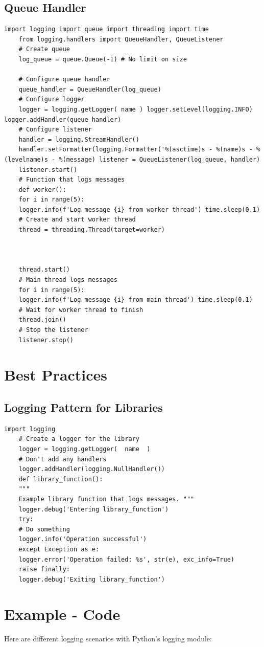 \subsection{Queue Handler}
\begin{lstlisting}[style=pythonstyle]
	import logging import queue import threading import time
	from logging.handlers import QueueHandler, QueueListener
	# Create queue
	log_queue = queue.Queue(-1)	# No limit on size
	
	# Configure queue handler
	queue_handler = QueueHandler(log_queue)
	# Configure logger
	logger = logging.getLogger( name ) logger.setLevel(logging.INFO) logger.addHandler(queue_handler)
	# Configure listener
	handler = logging.StreamHandler()
	handler.setFormatter(logging.Formatter('%(asctime)s - %(name)s - %(levelname)s - %(message) listener = QueueListener(log_queue, handler)
	listener.start()
	# Function that logs messages
	def worker():
	for i in range(5):
	logger.info(f'Log message {i} from worker thread') time.sleep(0.1)
	# Create and start worker thread
	thread = threading.Thread(target=worker)
	
	
	
	thread.start()
	# Main thread logs messages
	for i in range(5):
	logger.info(f'Log message {i} from main thread') time.sleep(0.1)
	# Wait for worker thread to finish
	thread.join()
	# Stop the listener
	listener.stop()
\end{lstlisting}

\section{Best Practices}
\subsection{Logging Pattern for Libraries}
\begin{lstlisting}[style=pythonstyle]
	import logging
	# Create a logger for the library
	logger = logging.getLogger(  name  )
	# Don't add any handlers
	logger.addHandler(logging.NullHandler())
	def library_function():
	"""
	Example library function that logs messages. """
	logger.debug('Entering library_function')
	try:
	# Do something
	logger.info('Operation successful')
	except Exception as e:
	logger.error('Operation failed: %s', str(e), exc_info=True)
	raise finally:
	logger.debug('Exiting library_function')
\end{lstlisting}

\section{Example - Code}
Here are different logging scenarios with Python's logging module:

